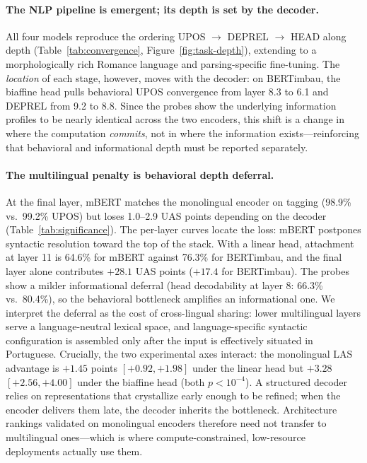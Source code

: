 \paragraph{The NLP pipeline is emergent; its depth is set by the decoder.}
All four models reproduce the ordering UPOS $\rightarrow$ DEPREL $\rightarrow$
HEAD along depth (Table~\ref{tab:convergence}, Figure~\ref{fig:task-depth}),
extending \citet{tenney2019bert} to a morphologically rich Romance language
and parsing-specific fine-tuning. The \emph{location} of each stage, however,
moves with the decoder: on BERTimbau, the biaffine head pulls behavioral UPOS
convergence from layer 8.3 to 6.1 and DEPREL from 9.2 to 8.8. Since the probes
show the underlying information profiles to be nearly identical across the two
encoders, this shift is a change in where the computation \emph{commits}, not
in where the information exists---reinforcing that behavioral and
informational depth must be reported separately.

\paragraph{The multilingual penalty is behavioral depth deferral.}
At the final layer, mBERT matches the monolingual encoder on tagging (98.9\%
vs.\ 99.2\% UPOS) but loses 1.0--2.9 UAS points depending on the decoder
(Table~\ref{tab:significance}). The per-layer curves locate the loss: mBERT
postpones syntactic resolution toward the top of the stack. With a linear
head, attachment at layer 11 is 64.6\% for mBERT against 76.3\% for BERTimbau,
and the final layer alone contributes $+28.1$ UAS points ($+17.4$ for
BERTimbau). The probes show a milder informational deferral (head
decodability at layer 8: 66.3\% vs.\ 80.4\%), so the behavioral bottleneck
amplifies an informational one. We interpret the deferral as the cost of
cross-lingual sharing: lower multilingual layers serve a language-neutral
lexical space, and language-specific syntactic configuration is assembled only
after the input is effectively situated in Portuguese. Crucially, the two
experimental axes interact: the monolingual LAS advantage is $+1.45$ points
$[+0.92, +1.98]$ under the linear head but $+3.28$ $[+2.56, +4.00]$ under the
biaffine head (both $p<10^{-4}$). A structured decoder relies on
representations that crystallize early enough to be refined; when the encoder
delivers them late, the decoder inherits the bottleneck. Architecture
rankings validated on monolingual encoders therefore need not transfer to
multilingual ones---which is where compute-constrained, low-resource
deployments actually use them.

